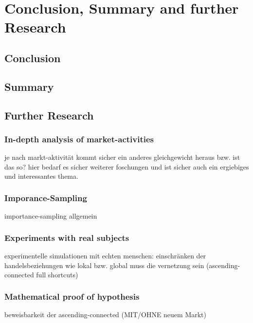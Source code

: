 \documentclass[Bachelorarbeit.tex]{subfiles}
\begin{document}
\chapter{Conclusion, Summary and further Research}

\section{Conclusion}

\section{Summary}

\section{Further Research}

\subsection{In-depth analysis of market-activities}
je nach markt-aktivität kommt sicher ein anderes gleichgewicht heraus bzw. ist das so?
hier bedarf es sicher weiterer foschungen und ist sicher auch ein ergiebiges und interessantes thema.

\subsection{Imporance-Sampling}
importance-sampling allgemein

\subsection{Experiments with real subjects}
experimentelle simulationen mit echten menschen: einschränken der handelsbeziehungen
wie lokal bzw. global muss die vernetzung sein (ascending-connected full shortcuts)

\subsection{Mathematical proof of hypothesis}
beweisbarkeit der ascending-connected (MIT/OHNE neuem Markt)
\end{document}
